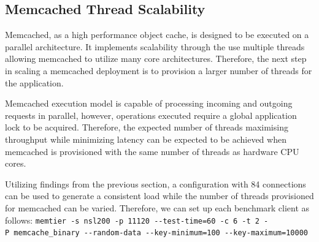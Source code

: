 

\subsection{Memcached Thread Scalability}
Memcached, as a high performance object cache, is designed to be executed on a parallel architecture. It implements scalability through the use multiple threads allowing memcached to utilize many core architectures. Therefore, the next step in scaling a memcached deployment is to provision a larger number of threads for the application.

Memcached execution model is capable of processing incoming and outgoing requests in parallel, however, operations executed require a global application lock to be acquired. Therefore, the expected number of threads maximising throughput while minimizing latency can be expected to be achieved when memcached is provisioned with the same number of threads as hardware CPU cores.

Utilizing findings from the previous section, a configuration with 84 connections can be used to generate a consistent load while the number of threads provisioned for memcached can be varied. Therefore, we can set up each benchmark client as follows:
\texttt{memtier\ -s\ nsl200\ -p\ 11120\ -\/-test-time=60\ -c\ 6\ -t\ 2\ -P\ memcache_binary\ -\/-random-data\ -\/-key-minimum=100\ -\/-key-maximum=10000}

